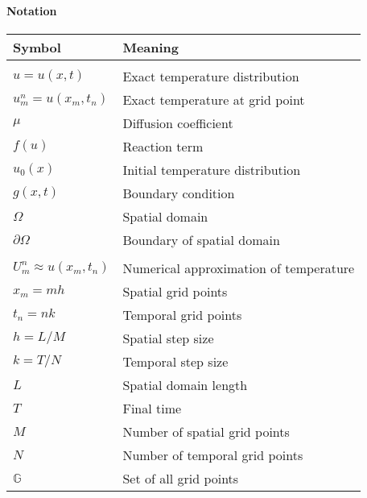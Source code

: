 \paragraph{Notation}
\begin{tabular}{ll}
  \textbf{Symbol}               & \textbf{Meaning}                       \\
  \hline                                                                 \\[-1em]
  \(u = u(x, t)\)               & Exact temperature distribution         \\
  \(u_m^n = u(x_m, t_n)\)       & Exact temperature at grid point        \\
  \(\mu\)                       & Diffusion coefficient                  \\
  \(f(u)\)                      & Reaction term                          \\
  \(u_0(x)\)                    & Initial temperature distribution       \\
  \(g(x, t)\)                   & Boundary condition                     \\
  \(\Omega\)                    & Spatial domain                         \\
  \(\partial \Omega\)           & Boundary of spatial domain             \\
  \hline                                                                 \\[-1em]
  \(U_m^n \approx u(x_m, t_n)\) & Numerical approximation of temperature \\
  \(x_m = m h\)                 & Spatial grid points                    \\
  \(t_n = n k\)                 & Temporal grid points                   \\
  \(h = L/M\)                   & Spatial step size                      \\
  \(k =T/N\)                    & Temporal step size                     \\
  \(L\)                         & Spatial domain length                  \\
  \(T\)                         & Final time                             \\
  \(M\)                         & Number of spatial grid points          \\
  \(N\)                         & Number of temporal grid points         \\
  \(\mathbb{G}\)                & Set of all grid points                 \\
  \hline
\end{tabular}


